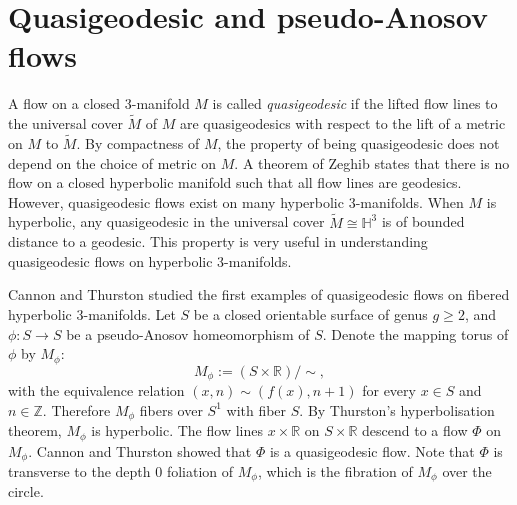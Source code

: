 \documentclass[11pt]{amsart}
\theoremstyle{remark}
\theoremstyle{definition}
\begin{document}
	\section{Quasigeodesic and pseudo-Anosov flows}
	
	\label{sec: flows}
	
	
	A flow on a closed 3-manifold $M$ is called \emph{quasigeodesic} if the lifted flow lines to the universal cover $\tilde{M}$ of $M$ are quasigeodesics with respect to the lift of a metric on $M$ to $\tilde{M}$. By compactness of $M$, the property of being quasigeodesic does not depend on the choice of metric on $M$. A theorem of Zeghib \cite{zeghib1993feuilletages} states that there is no flow on a closed hyperbolic manifold such that all flow lines are geodesics. However, quasigeodesic flows exist on many hyperbolic 3-manifolds. When $M$ is hyperbolic, any quasigeodesic in the universal cover $\tilde{M} \cong \mathbb{H}^3$ is of bounded distance to a geodesic. This property is very useful in understanding quasigeodesic flows on hyperbolic 3-manifolds. 
	
	Cannon and Thurston \cite{cannon2007group} studied the first examples of quasigeodesic flows on fibered hyperbolic 3-manifolds. Let $S$ be a closed orientable surface of genus $g \geq 2$, and $\phi \colon S \rightarrow S$ be a  pseudo-Anosov homeomorphism of $S$. Denote the mapping torus of $\phi $ by $M_\phi$:
	\[ M_\phi := (S \times \mathbb{R}) / \sim, \]
	with the equivalence relation $(x , n) \sim (f(x) , n+1)$ for every $x \in S$ and $n \in \mathbb{Z}$. Therefore $M_\phi$ fibers over $S^1$ with fiber $S$. By Thurston's hyperbolisation theorem, $M_\phi$ is hyperbolic. The flow lines $x \times \mathbb{R}$ on $S \times \mathbb{R}$ descend to a flow $\Phi$ on $M_\phi$. Cannon and Thurston showed that $\Phi$ is a quasigeodesic flow. Note that $\Phi$ is transverse to the depth $0$ foliation of $M_\phi$, which is the fibration of $M_\phi$ over the circle. 
	
\end{document}
